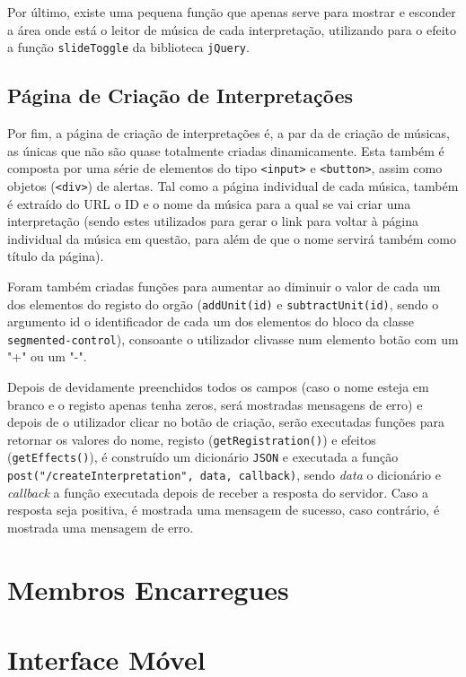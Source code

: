 \documentclass[a4paper,11pt,openright,oneside]{report}
\begin{document}
Por último, existe uma pequena função que apenas serve para mostrar e esconder a área onde está o leitor de música de cada interpretação, utilizando para o efeito a função \texttt{slideToggle} da biblioteca \verb|jQuery|.

\subsection{Página de Criação de Interpretações}
\label{sec.mobile.createinterpretation}

Por fim, a página de criação de interpretações é, a par da de criação de músicas, as únicas que não são quase totalmente criadas dinamicamente. Esta também é composta por uma série de elementos do tipo \texttt{<input>} e \texttt{<button>}, assim como objetos (\texttt{<div>}) de alertas. Tal como a página individual de cada música, também é extraído do URL o ID e o nome da música para a qual se vai criar uma interpretação (sendo estes utilizados para gerar o link para voltar à página individual da música em questão, para além de que o nome servirá também como título da página).

Foram também criadas funções para aumentar ao diminuir o valor de cada um dos elementos do registo do orgão (\texttt{addUnit(id)} e \texttt{subtractUnit(id)}, sendo o argumento id o identificador de cada um dos elementos do bloco da classe \texttt{segmented-control}), consoante o utilizador clivasse num elemento botão com um "+" ou um "-".

Depois de devidamente preenchidos todos os campos (caso o nome esteja em branco e o registo apenas tenha zeros, será mostradas mensagens de erro) e depois de o utilizador clicar no botão de criação, serão executadas funções para retornar os valores do nome, registo (\texttt{getRegistration()}) e efeitos (\texttt{getEffects()}), é construído um dicionário \verb|JSON| e executada a função \texttt{post("/createInterpretation", data, callback)}, sendo \textit{data} o dicionário e \textit{callback} a função executada depois de receber a resposta do servidor. Caso a resposta seja positiva, é mostrada uma mensagem de sucesso, caso contrário, é mostrada uma mensagem de erro.

\section*{Membros Encarregues}
\section{Interface Móvel}
\label{sec.mobile}
\end{document}
